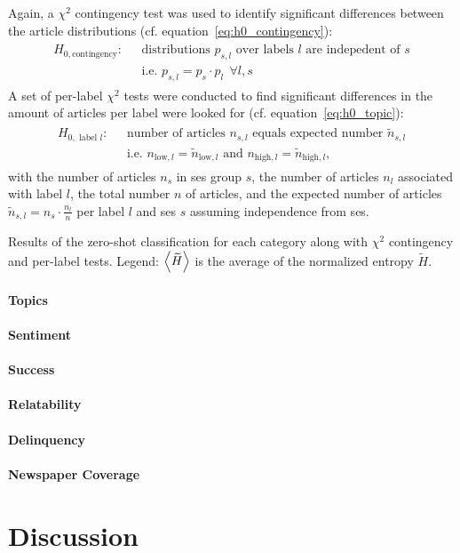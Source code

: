 Again, a $\chi^2$ contingency test was used to identify significant differences between the article distributions (cf. equation~\eqref{eq:h0_contingency}):
\begin{align}
    \begin{split}
        H_{0, \text{contingency}}: ~~~ &\text{distributions } p_{s, l} \text{ over labels } l \text{ are indepedent of } s\\
    & \text{i.e. } p_{s, l} = p_s \cdot p_l ~~ \forall l, s
    \end{split}
\end{align}
A set of per-label $\chi^2$ tests were conducted to find significant differences in the amount of articles per label were looked for (cf. equation~\eqref{eq:h0_topic}):
\begin{align}
    \begin{split}
        H_{0, \text{ label }l}: ~~~ &\text{number of articles } n_{s, l} \text{ equals expected number } \tilde n_{s, l} \\
        & \text{i.e. } n_{\text{low}, l} = \tilde n_{\text{low}, l} \text{ and } n_{\text{high}, l} = \tilde n_{\text{high}, l},
    \end{split}
\end{align}
with the number of articles $n_s$ in \gls{ses} group $s$, the number of articles $n_l$ associated with label $l$, the total number $n$ of articles, and the expected number of articles $\tilde n_{s, l} = n_s \cdot \frac{n_l}{n}$ per label $l$ and \gls{ses} $s$ assuming independence from \gls{ses}.

\begin{table}
    \centering
    \resizebox{0.85\textwidth}{!}{}
    \caption{Results of the zero-shot classification for each category along with $\chi^2$ contingency and per-label tests. Legend: $\Braket{\widetilde{H}}$ is the average of the normalized entropy $\widetilde{H}$.}\label{tab:zero_shot_result_table}
\end{table}

\paragraph{Topics}
\paragraph{Sentiment}
\paragraph{Success}
\paragraph{Relatability}
\paragraph{Delinquency}
\paragraph{Newspaper Coverage}

\section{Discussion}